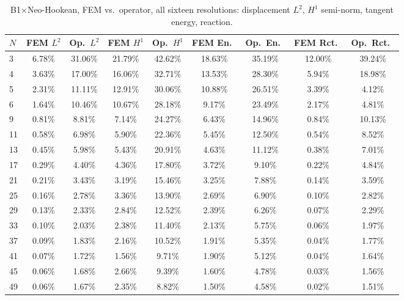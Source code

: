 \documentclass[final,5p,times]{elsarticle}
\begin{document}
\begin{table}[ht]
\centering
\caption{B1$\times$Neo-Hookean, FEM vs.\ operator, all sixteen resolutions:
  displacement $L^2$, $H^1$ semi-norm, tangent energy, reaction.}
\label{tab:b1-b1nh-a}
\scriptsize
\begin{tabular}{lcccccccc}
\toprule
$N$ & FEM $L^2$ & Op.\ $L^2$ & FEM $H^1$ & Op.\ $H^1$ & FEM En.\ & Op.\ En.\ & FEM Rct.\ & Op.\ Rct.\ \\
\midrule
3  & 6.78\%  & 31.06\% & 21.79\% & 42.62\% & 18.63\% & 35.19\% & 12.00\% & 39.24\% \\
4  & 3.63\%  & 17.00\% & 16.06\% & 32.71\% & 13.53\% & 28.30\% & 5.94\%  & 18.98\% \\
5  & 2.31\%  & 11.11\% & 12.91\% & 30.06\% & 10.88\% & 26.51\% & 3.39\%  & 4.12\%  \\
6  & 1.64\%  & 10.46\% & 10.67\% & 28.18\% & 9.17\%  & 23.49\% & 2.17\%  & 4.81\%  \\
9  & 0.81\%  & 8.81\%  & 7.14\%  & 24.27\% & 6.43\%  & 14.96\% & 0.84\%  & 10.13\% \\
11 & 0.58\%  & 6.98\%  & 5.90\%  & 22.36\% & 5.45\%  & 12.50\% & 0.54\%  & 8.52\%  \\
13 & 0.45\%  & 5.98\%  & 5.43\%  & 20.91\% & 4.63\%  & 11.12\% & 0.38\%  & 7.01\%  \\
17 & 0.29\%  & 4.40\%  & 4.36\%  & 17.80\% & 3.72\%  & 9.10\%  & 0.22\%  & 4.84\%  \\
21 & 0.21\%  & 3.43\%  & 3.19\%  & 15.46\% & 3.25\%  & 7.88\%  & 0.14\%  & 3.59\%  \\
25 & 0.16\%  & 2.78\%  & 3.36\%  & 13.90\% & 2.69\%  & 6.90\%  & 0.10\%  & 2.82\%  \\
29 & 0.13\%  & 2.33\%  & 2.84\%  & 12.52\% & 2.39\%  & 6.26\%  & 0.07\%  & 2.29\%  \\
33 & 0.10\%  & 2.03\%  & 2.38\%  & 11.40\% & 2.13\%  & 5.75\%  & 0.06\%  & 1.97\%  \\
37 & 0.09\%  & 1.83\%  & 2.16\%  & 10.52\% & 1.91\%  & 5.35\%  & 0.04\%  & 1.77\%  \\
41 & 0.07\%  & 1.72\%  & 1.56\%  & 9.71\%  & 1.90\%  & 5.12\%  & 0.04\%  & 1.64\%  \\
45 & 0.06\%  & 1.68\%  & 2.66\%  & 9.39\%  & 1.60\%  & 4.78\%  & 0.03\%  & 1.56\%  \\
49 & 0.06\%  & 1.67\%  & 2.35\%  & 8.82\%  & 1.50\%  & 4.58\%  & 0.02\%  & 1.51\%  \\
\bottomrule
\end{tabular}
\end{table}
\end{document}
